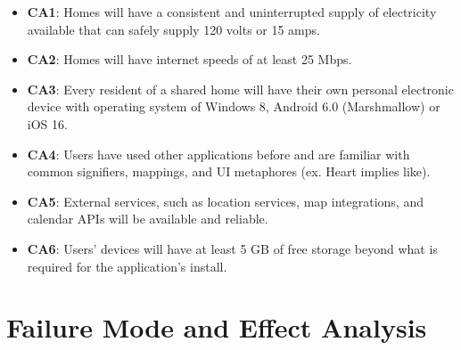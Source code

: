 \documentclass[12pt, titlepage]{article}
\begin{document}
\begin{itemize}
\item \textbf{CA1}: Homes will have a consistent and uninterrupted supply of electricity available that can safely supply 120 volts or 15 amps.
\item \textbf{CA2}: Homes will have internet speeds of at least 25 Mbps.
\item \textbf{CA3}: Every resident of a shared home will have their own personal electronic device with operating system of Windows 8, Android 6.0 (Marshmallow) or iOS 16.
\item \textbf{CA4}: Users have used other applications before and are familiar with common signifiers, mappings, and UI metaphores (ex. Heart implies like).
\item \textbf{CA5}: External services, such as location services, map integrations, and calendar APIs will be available and reliable.
\item \textbf{CA6}: Users' devices will have at least 5 GB of free storage beyond what is required for the application's install.
\end{itemize}

\newpage


\section{Failure Mode and Effect Analysis}
\end{document}
